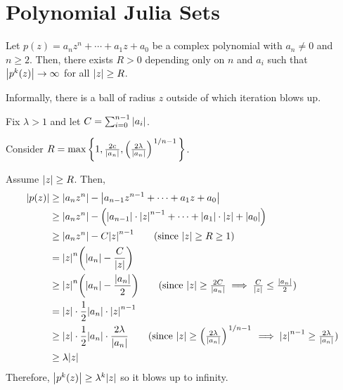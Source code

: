 \documentclass[class=pmath370,tikz,notes]{agony}
\begin{document}
\chapter{Polynomial Julia Sets}

\begin{theorem}
  Let $p(z) = a_nz^n + \dotsb + a_1z + a_0$ be a complex polynomial
  with $a_n \neq 0$ and $n \geq 2$.
  Then, there exists $R > 0$ depending only on $n$ and $a_i$ such that
  $\abs{p^k(z)} \to \infty$ for all $\abs{z} \geq R$.
\end{theorem}

Informally, there is a ball of radius $z$ outside of which iteration blows up.

\begin{prf}
  Fix $\lambda > 1$ and let $C = \sum_{i=0}^{n-1}\abs{a_i}$.

  Consider $R = \max\qty{1,\frac{2c}{\abs{a_n}},\qty(\frac{2\lambda}{\abs{a_n}})^{\flatfrac{1}{n-1}}}$.

  Assume $\abs{z} \geq R$. Then,
  \begin{align*}
    \abs{p(z)} & \geq \abs{a_nz^n} - \abs{a_{n-1}z^{n-1} + \dotsb + a_1z + a_0}                                                                                                                                              \\
               & \geq \abs{a_nz^n} - \qty(\abs{a_{n-1}}\cdot\abs{z}^{n-1} + \dotsb + \abs{a_1}\cdot\abs{z} + \abs{a_0})                                                                                                      \\
               & \geq \abs{a_nz^n} - C\abs{z}^{n-1} \tag{since $\abs{z} \geq R \geq 1$}                                                                                                                                      \\
               & = \abs{z}^n\qty(\abs{a_n}-\frac{C}{\abs{z}})                                                                                                                                                                \\
               & \geq \abs{z}^n\qty(\abs{a_n}-\frac{\abs{a_n}}{2}) \tag{since $\abs{z} \geq \frac{2C}{\abs{a_n}} \implies \frac{C}{\abs{z}}\leq\frac{\abs{a_n}}{2}$}                                                         \\
               & = \abs{z} \cdot \frac12\abs{a_n} \cdot \abs{z}^{n-1}                                                                                                                                                        \\
               & \geq \abs{z} \cdot \frac12\abs{a_n} \cdot \frac{2\lambda}{\abs{a_n}} \tag{since $\abs{z} \geq \qty(\frac{2\lambda}{\abs{a_n}})^{\flatfrac{1}{n-1}} \implies \abs{z}^{n-1} \geq \frac{2\lambda}{\abs{a_n}}$} \\
               & \geq \lambda\abs{z}
  \end{align*}
  Therefore, $\abs{p^k(z)} \geq \lambda^k\abs{z}$ so it blows up to infinity.
\end{prf}
\end{document}
